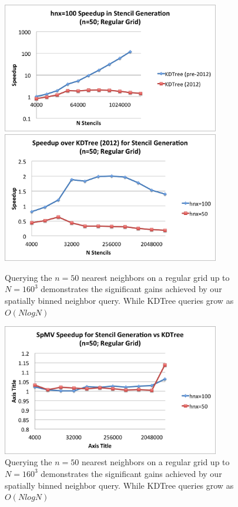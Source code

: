 \documentclass{report}
\begin{document}
\begin{figure}
\centering
\includegraphics[width=9.5cm]{../figures/stencils/kdtree_old_reg_subsets_4m_stencil_gen_speedup.png}
\includegraphics[width=9.5cm]{../figures/stencils/reg_subsets_4m_stencil_gen_speedup.png}
\caption{Querying the $n=50$ nearest neighbors on a regular grid up to $N=160^3$ demonstrates the significant gains achieved by our spatially binned neighbor query. While KDTree queries grow as $O(N log N)$}
\label{fig:hash_results}
\end{figure}
\begin{figure}
\centering
\includegraphics[width=9.5cm]{../figures/stencils/reg_subsets_4m_spmv_speedup.png}
\caption{Querying the $n=50$ nearest neighbors on a regular grid up to $N=160^3$ demonstrates the significant gains achieved by our spatially binned neighbor query. While KDTree queries grow as $O(N log N)$}
\label{fig:hash_results}
\end{figure}
\end{document}
